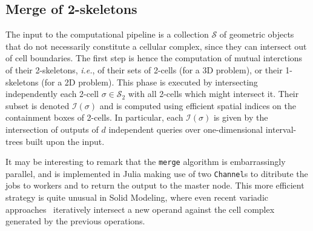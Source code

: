 \documentclass{juliacon}
\begin{document}
\subsection{Merge of 2-skeletons}
The input to the computational pipeline is a collection $\mathcal{S}$ of geometric objects that do not necessarily constitute a cellular complex, since they can intersect out of cell boundaries. The first step is hence the computation of mutual interctions of their 2-skeletons, \emph{i.e.}, of their sets of 2-cells (for a 3D problem), or their 1-skeletons (for a 2D problem). This phase is executed by intersecting independently each 2-cell $\sigma\in\mathcal{S}_2$ with all 2-cells which might intersect it. Their subset is denoted $\mathcal{I}(\sigma)$ and is computed using efficient spatial indices on the containment boxes of 2-cells. In particular, each $\mathcal{I}(\sigma)$ is given by the intersection of outputs of $d$ independent queries over one-dimensional interval-trees built upon the input.

It may be interesting to remark that the \texttt{merge} algorithm is embarrassingly parallel, and is implemented in Julia making use of two \texttt{Channel}s to ditribute the jobs to workers and to return the output to the master node. This more efficient strategy is quite unusual in Solid Modeling, where even recent variadic approaches~\cite{Zhou:2016:MAS:2897824.2925901} iteratively intersect a new operand against the cell complex generated by the previous operations. 
\end{document}

